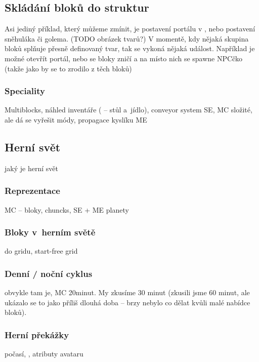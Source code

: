 \subsection{Skládání bloků do struktur}
Asi jediný příklad, který můžeme zmínit, je postavení portálu v , nebo postavení sněhuláka či golema. (TODO obrázek tvarů?) V momentě, kdy nějaká skupina bloků splňuje přesně definovaný tvar, tak se vykoná nějaká událost. Například je možné otevřít portál, nebo se bloky zničí a na místo nich se spawne NPCčko (takže jako by se to zrodilo z těch bloků) 



\subsubsection{Speciality}
Multiblocks, náhled inventáře (\ME{} -- stůl a~jídlo), conveyor system SE, MC složité, ale dá se vyřešit módy, propagace kyslíku ME

\subsection{Herní svět}

jaký je herní svět

\subsubsection{Reprezentace}

MC -- bloky, chuncks, SE + ME planety

\subsubsection{Bloky v~herním světě}

do gridu, start-free grid


\subsubsection{Denní / noční cyklus}

obvykle tam je, MC 20minut. My zkusíme 30 minut (zkusili jsme 60 minut, ale ukázalo se to jako příliš dlouhá doba -- brzy nebylo co dělat kvůli malé nabídce bloků).

\subsubsection{Herní překážky}

počasí, \NPC{}, atributy avataru


